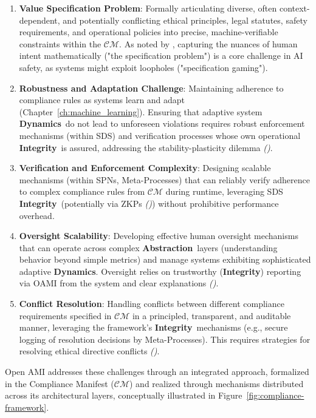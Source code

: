 \documentclass[12pt,a4paper]{report}
\renewcommand{\citep}[1]{\textit{\scriptsize{(\cite{#1})}}}
\newcommand{\Integrity}{\textbf{Integrity}}
\newcommand{\Abstraction}{\textbf{Abstraction}}
\newcommand{\Dynamics}{\textbf{Dynamics}}
\begin{document}
	\begin{enumerate}
		\item \textbf{Value Specification Problem}: Formally articulating diverse, often context-dependent, and potentially conflicting ethical principles, legal statutes, safety requirements, and operational policies into precise, machine-verifiable constraints within the $\mathcal{CM}$. As noted by \citet{Kovac2025SpecGaming}, capturing the nuances of human intent mathematically ("the specification problem") is a core challenge in AI safety, as systems might exploit loopholes ("specification gaming").
		\item \textbf{Robustness and Adaptation Challenge}: Maintaining adherence to compliance rules as systems learn and adapt (Chapter~\ref{ch:machine_learning}). Ensuring that adaptive system \Dynamics\ do not lead to unforeseen violations requires robust enforcement mechanisms (within SDS) and verification processes whose own operational \Integrity\ is assured, addressing the stability-plasticity dilemma \citep{Wang2024ContinualLearningSurvey}.
		\item \textbf{Verification and Enforcement Complexity}: Designing scalable mechanisms (within SPNs, Meta-Processes) that can reliably verify adherence to complex compliance rules from $\mathcal{CM}$ during runtime, leveraging SDS \Integrity\ (potentially via ZKPs \citep{Peng2025ZKMLSurvey}) without prohibitive performance overhead.
		\item \textbf{Oversight Scalability}: Developing effective human oversight mechanisms that can operate across complex \Abstraction\ layers (understanding behavior beyond simple metrics) and manage systems exhibiting sophisticated adaptive \Dynamics. Oversight relies on trustworthy (\Integrity) reporting via OAMI from the system and clear explanations \citep{Crossing_Principle_Practice_Gap_2024}.
		\item \textbf{Conflict Resolution}: Handling conflicts between different compliance requirements specified in $\mathcal{CM}$ in a principled, transparent, and auditable manner, leveraging the framework's \Integrity\ mechanisms (e.g., secure logging of resolution decisions by Meta-Processes). This requires strategies for resolving ethical directive conflicts \citep{Sekrst2024Guardrails}.
	\end{enumerate}
	
	Open AMI addresses these challenges through an integrated approach, formalized in the Compliance Manifest ($\mathcal{CM}$) and realized through mechanisms distributed across its architectural layers, conceptually illustrated in Figure~\ref{fig:compliance-framework}.
	
\end{document}
